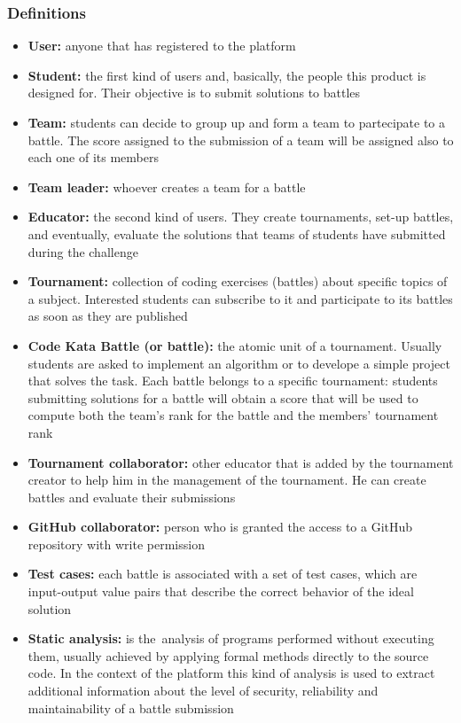 \subsubsection{Definitions}
\begin{itemize}
    \item {\textbf{User:} anyone that has registered to the platform}
    \item {\textbf{Student:} the first kind of users and, basically, the people this product is designed for. Their objective is to submit solutions to battles}
    \item {\textbf{Team:} students can decide to group up and form a team to partecipate to a battle. The score assigned to the submission of a team will be assigned also to each one of its members}
    \item {\textbf{Team leader:} whoever creates a team for a battle}
    \item {\textbf{Educator:} the second kind of users. They create tournaments, set-up battles, and eventually, evaluate the solutions that teams of students have submitted during the challenge}
    \item {\textbf{Tournament:} collection of coding exercises (battles) about specific topics of a subject. Interested students can subscribe to it and participate to its battles as soon as they are published}
    \item {\textbf{Code Kata Battle (or battle):} the atomic unit of a tournament. Usually students are asked to implement an algorithm or to develope a simple project that solves the task. Each battle belongs to a specific tournament: students submitting solutions for a battle will obtain a score that will be used to compute both the team's rank for the battle and the members' tournament rank}
    \item {\textbf{Tournament collaborator:} other educator that is added by the tournament creator to help him in the management of the tournament. He can create battles and evaluate their submissions}
    \item {\textbf{GitHub collaborator:} person who is granted the access to a GitHub repository with write permission}
    \item {\textbf{Test cases:} each battle is associated with a set of test cases, which  are input-output value pairs that describe the correct behavior of the ideal solution}
    \item {\textbf{Static analysis:} is the analysis of programs performed without executing them, usually achieved by applying formal methods directly to the source code. In the context of the platform this kind of analysis is used to extract additional information about the level of security, reliability and maintainability of a battle submission}

\end{itemize}
